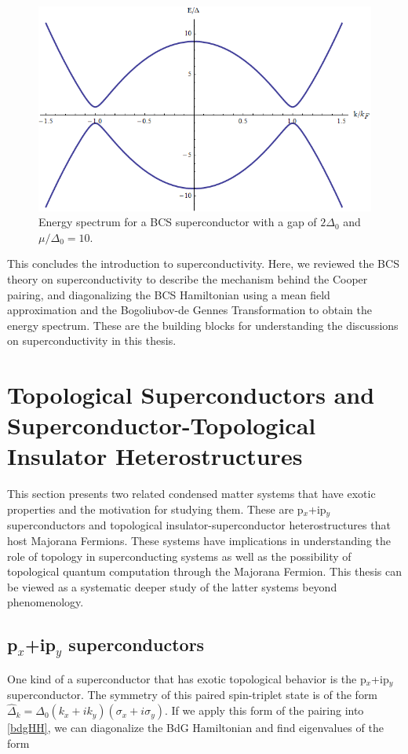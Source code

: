 \begin{figure}
\center
\includegraphics[width=.95 \textwidth]{include/bcsplot.png}
\caption{Energy spectrum for a BCS superconductor with a gap of $2\Delta_0$ and $\mu/\Delta_0=10$.
} \label{bcsplot}
\end{figure}

This concludes the introduction to superconductivity. Here, we reviewed  the BCS theory on superconductivity to describe the mechanism behind the Cooper pairing, and diagonalizing the BCS Hamiltonian using a mean field approximation and the Bogoliubov-de Gennes Transformation to obtain the energy spectrum. These are the building blocks for understanding the discussions on superconductivity in this thesis. 

\section{Topological Superconductors and Superconductor-Topological Insulator Heterostructures}
This section presents two related condensed matter systems that have exotic properties and the motivation for studying them. These are p$_x$+ip$_y$ superconductors and topological insulator-superconductor heterostructures that host Majorana Fermions. These systems have implications in understanding the role of topology in superconducting systems as well as the possibility of topological quantum computation through the Majorana Fermion. This thesis can be viewed as a systematic deeper study of the latter systems beyond phenomenology. 
\subsection{p$_x$+ip$_y$ superconductors}
One kind of a superconductor that has exotic topological behavior is the p$_x$+ip$_y$ superconductor. The symmetry of this paired spin-triplet state is of the form $\hat{\Delta}_k=\Delta_0 (k_x+ik_y) (\sigma_x+i\sigma_y)$. If we apply this form of the pairing into \eqref{bdgHH}, we can diagonalize the BdG Hamiltonian and find eigenvalues of the form

